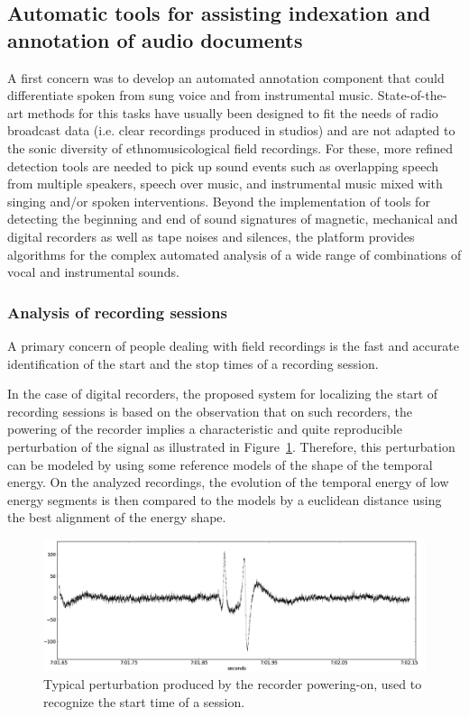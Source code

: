 \documentclass{sig-alternate}
\begin{document}
\subsection{Automatic tools for assisting indexation and annotation of audio documents}
A first concern was to develop an automated annotation component that could differentiate spoken from sung voice and from instrumental music. State-of-the-art methods for this tasks have usually been designed to fit the needs of radio broadcast data (i.e. clear recordings produced in studios) and are not adapted to the sonic diversity of ethnomusicological field recordings. For these, more refined detection tools are needed to pick up sound events such as overlapping speech from multiple speakers, speech over music, and instrumental music mixed with singing and/or spoken interventions.
Beyond the implementation of tools for detecting the beginning and end of sound signatures of magnetic, mechanical and digital recorders as well as tape noises and silences, the platform provides algorithms for the complex automated analysis of a wide range of combinations of vocal and instrumental sounds.


\subsubsection{Analysis of recording sessions}
A primary concern of people dealing with field recordings is the fast and accurate identification of the start and the stop times of a recording session.

In the case of digital recorders, the proposed system for localizing the start of recording sessions is based on the observation that on such recorders, the powering of the recorder implies a characteristic and quite reproducible perturbation of the signal as illustrated in Figure~\ref{plop}. Therefore, this perturbation can be modeled by using some reference models of the shape of the temporal energy. On the analyzed recordings, the evolution of the temporal energy of low energy segments is then compared to the models by a euclidean distance using the best alignment of the energy shape.

\begin{figure}[htb]
 \centering
    \includegraphics[width=0.8\linewidth]{img/plop.png}
    \caption{Typical perturbation produced by the recorder powering-on, used to recognize the start time of a session.}
    \label{plop}
\end{figure}
\end{document}
